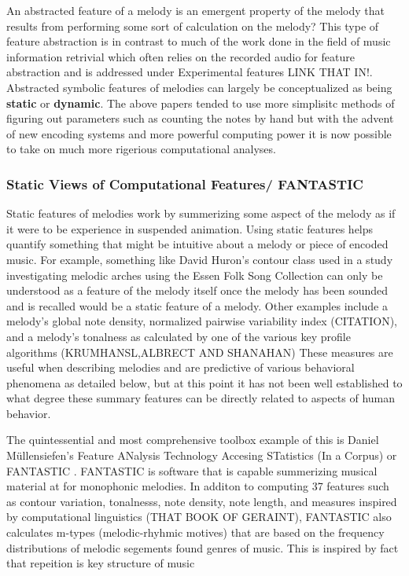 \documentclass[]{book}
\theoremstyle{definition}
\theoremstyle{definition}
\theoremstyle{definition}
\theoremstyle{remark}
\begin{document}
An abstracted feature of a melody is an emergent property of the melody
that results from performing some sort of calculation on the melody?
This type of feature abstraction is in contrast to much of the work done
in the field of music information retrivial which often relies on the
recorded audio for feature abstraction and is addressed under
Experimental features LINK THAT IN!. Abstracted symbolic features of
melodies can largely be conceptualized as being \textbf{static} or
\textbf{dynamic}. The above papers tended to use more simplisitc methods
of figuring out parameters such as counting the notes by hand but with
the advent of new encoding systems and more powerful computing power it
is now possible to take on much more rigerious computational analyses.

\hypertarget{static-views-of-computational-features-fantastic}{%
\subsubsection{Static Views of Computational Features/
FANTASTIC}\label{static-views-of-computational-features-fantastic}}

Static features of melodies work by summerizing some aspect of the
melody as if it were to be experience in suspended animation. Using
static features helps quantify something that might be intuitive about a
melody or piece of encoded music. For example, something like David
Huron's contour class used in a study investigating melodic arches
\citep{huronMelodicArchWestern1996} using the Essen Folk Song Collection
\citep{schaffrathEssenFolkSong1995} can only be understood as a feature
of the melody itself once the melody has been sounded and is recalled
would be a static feature of a melody. Other examples include a melody's
global note density, normalized pairwise variability index (CITATION),
and a melody's tonalness as calculated by one of the various key profile
algorithms (KRUMHANSL,ALBRECT AND SHANAHAN) These measures are useful
when describing melodies and are predictive of various behavioral
phenomena as detailed below, but at this point it has not been well
established to what degree these summary features can be directly
related to aspects of human behavior.

The quintessential and most comprehensive toolbox example of this is
Daniel Müllensiefen's Feature ANalysis Technology Accesing STatistics
(In a Corpus) or FANTASTIC
\citep{mullensiefenFantasticFeatureANalysis2009}. FANTASTIC is software
that is capable summerizing musical material at for monophonic melodies.
In additon to computing 37 features such as contour variation,
tonalnesss, note density, note length, and measures inspired by
computational linguistics (THAT BOOK OF GERAINT), FANTASTIC also
calculates m-types (melodic-rhyhmic motives) that are based on the
frequency distributions of melodic segements found genres of music. This
is inspired by fact that repeition is key structure of music
\citep{huronSweetAnticipation2006}
\end{document}
